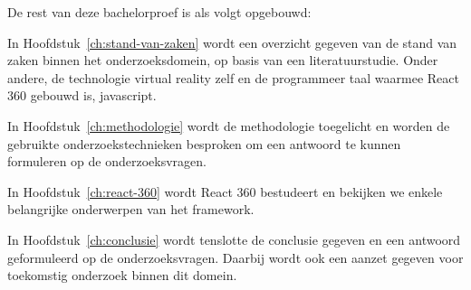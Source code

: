 
De rest van deze bachelorproef is als volgt opgebouwd:

In Hoofdstuk~\ref{ch:stand-van-zaken} wordt een overzicht gegeven van de stand van zaken binnen het onderzoeksdomein, op basis van een literatuurstudie. Onder andere, de technologie virtual reality zelf en de programmeer taal waarmee React 360 gebouwd is, javascript.

In Hoofdstuk~\ref{ch:methodologie} wordt de methodologie toegelicht en worden de gebruikte onderzoekstechnieken besproken om een antwoord te kunnen formuleren op de onderzoeksvragen.

In Hoofdstuk~\ref{ch:react-360} wordt React 360 bestudeert en bekijken we enkele belangrijke onderwerpen van het framework.

In Hoofdstuk~\ref{ch:conclusie} wordt tenslotte de conclusie gegeven en een antwoord geformuleerd op de onderzoeksvragen. Daarbij wordt ook een aanzet gegeven voor toekomstig onderzoek binnen dit domein.


